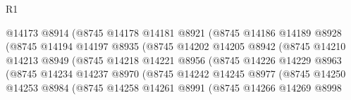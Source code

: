 \begin{lexlean}{R1}
\begin{coremodule}
                                  @14173
                                  @8914
                                  (@8745
                                    @14178
                                    @14181
                                    @8921
                                    (@8745
                                      @14186
                                      @14189
                                      @8928
                                      (@8745
                                        @14194
                                        @14197
                                        @8935
                                        (@8745
                                          @14202
                                          @14205
                                          @8942
                                          (@8745
                                            @14210
                                            @14213
                                            @8949
                                            (@8745
                                              @14218
                                              @14221
                                              @8956
                                              (@8745
                                                @14226
                                                @14229
                                                @8963
                                                (@8745
                                                  @14234
                                                  @14237
                                                  @8970
                                                  (@8745
                                                    @14242
                                                    @14245
                                                    @8977
                                                    (@8745
                                                      @14250
                                                      @14253
                                                      @8984
                                                      (@8745
                                                        @14258
                                                        @14261
                                                        @8991
                                                        (@8745
                                                          @14266
                                                          @14269
                                                          @8998

\end{coremodule}
\end{lexlean}
